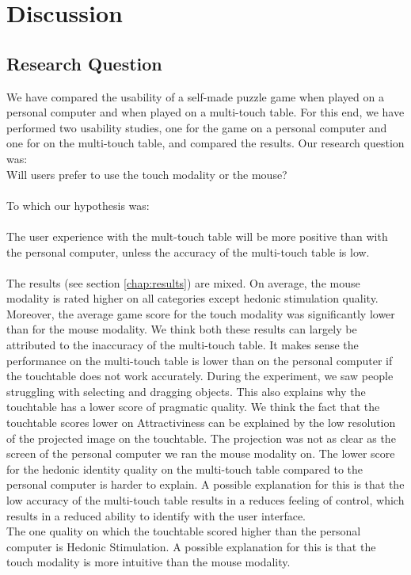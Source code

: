 \documentclass[a4paper,10pt]{report}
\begin{document}
\chapter{Discussion}
\label{chap:discussion}

\section{Research Question}
We have compared the usability of a self-made puzzle game when played on a personal computer and when played on a multi-touch table. For this end, we have performed two usability studies, one for the game on a personal computer and one for on the multi-touch table, and compared the results. Our research question was:\\Will users prefer to use the touch modality or the mouse? \\ \\To which our hypothesis was: \\ \\The user experience with the mult-touch table will be more positive than with the personal computer, unless the accuracy of the multi-touch table is low. \\\\ The results (see section \ref{chap:results}) are mixed. On average, the mouse modality is rated higher on all categories except hedonic stimulation quality. Moreover, the average game score for the touch modality was significantly lower than for the mouse modality. We think both these results can largely be attributed to the inaccuracy of the multi-touch table. It makes sense the performance on the multi-touch table is lower than on the personal computer if the touchtable does not work accurately. During the experiment, we saw people struggling with selecting and dragging objects. This also explains why the touchtable has a lower score of pragmatic quality. We think the fact that the touchtable scores lower on Attractiviness can be explained by the low resolution of the projected image on the touchtable. The projection was not as clear as the screen of the personal computer we ran the mouse modality on. The lower score for the hedonic identity quality on the multi-touch table compared to the personal computer is harder to explain. A possible explanation for this is that the low accuracy of the multi-touch table results in a reduces feeling of control, which results in a reduced ability to identify with the user interface. \\ The one quality on which the touchtable scored higher than the personal computer is Hedonic Stimulation. A possible explanation for this is that the touch modality is more intuitive than the mouse modality. \\ 
\end{document}
